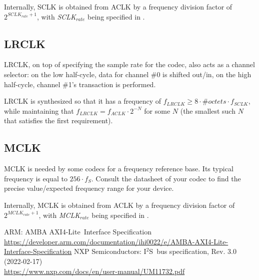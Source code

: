 \documentclass{datasheet}
\newcommand{\iis}{I$^2$S}
\newcommand{\al}{AXI4-Lite}
\begin{document}
	Internally, SCLK is obtained from ACLK by a frequency division factor of $2^{SCLK_{rate}+1}$, with \textit{SCLK$_{rate}$} being specified in .

	\subsection{LRCLK}\label{sec:clk:lrclk}
	LRCLK, on top of specifying the sample rate for the codec, also acts as a channel selector: on the low half-cycle, data for channel \#0 is shifted out/in, on the high half-cycle, channel \#1's transaction is performed.

	LRCLK is synthesized so that it has a frequency of $f_{LRCLK}\geq8\cdot\#octets\cdot f_{SCLK}$, while maintaining that $f_{LRCLK}=f_{ACLK}\cdot2^{-N}$ for some $N$ (the smallest such $N$ that satisfies the first requirement).

	\subsection{MCLK}\label{sec:clk:mclk}
	MCLK is needed by some codecs for a frequency reference base. Its typical frequency is equal to $256\cdot f_S$. Consult the datasheet of your codec to find the precise value/expected frequency range for your device.

	Internally, MCLK is obtained from ACLK by a frequency division factor of $2^{MCLK_{rate}+1}$, with \textit{MCLK$_{rate}$} being specified in .

	\pagebreak

	\begin{thebibliography}{9}
		ARM: AMBA \al\ Interface Specification\\
		\url{https://developer.arm.com/documentation/ihi0022/e/AMBA-AXI4-Lite-Interface-Specification}
		NXP Semiconductors: \iis\ bus specification, Rev. 3.0 (2022-02-17)\\
		\url{https://www.nxp.com/docs/en/user-manual/UM11732.pdf}
	\end{thebibliography}
\end{document}
